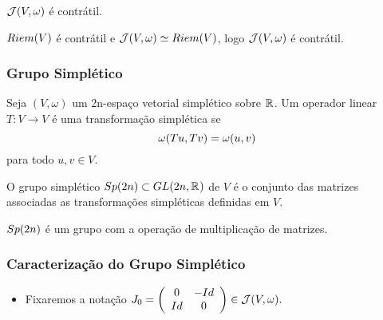 \documentclass{beamer}
\begin{document}
\begin{footnotesize}
\begin{frame}
\begin{definicao}
\begin{itemize}
			\end{itemize}
		\end{definicao}
	
		\begin{teorema}
				$\mathcal{J}(V, \omega)$ é contrátil.
			\end{teorema}
			\begin{prova}
				$Riem(V)$ é contrátil e $\mathcal{J}(V, \omega) \simeq Riem(V)$, logo $\mathcal{J}(V, \omega) $ é contrátil.
			\end{prova}
	\end{frame}
	
	\begin{frame}
		\frametitle{Grupo Simplético}
		
		\begin{definicao}
			Seja $(V, \omega)$ um 2n-espaço vetorial simplético sobre $\mathbb{R}^{}$. Um operador linear $T: V \to V$ é uma transformação simplética se 
			$$
			\omega(Tu, Tv) = \omega(u, v)
			$$ para todo $u,v\in V$.
		\end{definicao}
		
		\begin{definicao}
			O grupo simplético $Sp(2n) \subset GL(2n, \mathbb{R}^{})$ de $V$ é o conjunto das matrizes associadas as transformações simpléticas definidas em $V$.
		\end{definicao}	
		
		\begin{proposicao}
			$Sp(2n)$ é um grupo com a operação de multiplicação de matrizes.
		\end{proposicao}
		
		
	\end{frame}
	
	\begin{frame}
		\frametitle{Caracterização do Grupo Simplético}
	
			\begin{itemize}
				\item Fixaremos a notação
				$
				J_{0}=
				\left(
				\begin{array}{cc}
				0 & -Id
				\\
				Id & 0
				\end{array}
				\right) \in \mathcal{J}(V, \omega) .
				$
			\end{itemize}
		

\end{frame}
\end{footnotesize}
\end{document}

